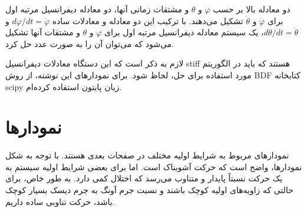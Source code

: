 \documentclass[12pt,a4paper]{article}
\begin{document}
	دو معادله بالا بر حسب $\varphi$ و $\theta$ و مشتقات زمانی آنها، دو معادله دیفرانسیل مرتبه اول برای $\dot{\varphi}$ و $\dot{\theta}$ تشکیل می‌دهند.
	با ترکیب این دو معادله و معادلات ساده $d\varphi/dt = \dot{\varphi}$ و $d\theta/dt = \dot{\theta}$،
	یک سیستم معادله دیفرانسیل مرتبه اول برای $\varphi$ و $\theta$ و مشتقات آنها تشکیل می‌شود که می‌توان آن را به صورت عدد حل کرد.
	
	لازم به ذکر است که این دستگاه معادلات دیفرانسیل stiff هستند که باید در الگوریتم مورد استفاده برای حل، لحاظ شود.
	برای نمودارهای این نوشته، از روش BDF کتابخانه scipy زبان پایتون استفاده کرده‌ام.
	\section{نمودارها}
	نمودارهای مربوط به شرایط اولیه مختلف در صفحات بعدی هستند. با توجه به شکل نمودارها، واضح است که حرکت آشوبناک است.
	اما برای بعضی شرایط اولیه سیستم به یک حرکت نسبتاً پایدار و متناوب می‌رسد که اختلال کمی دارد.
	به طور خاص، برای حالتی که زاویه‌های اولیه کوچک باشند و نسبت جرم آونگ به جرم دیسک بسیار کوچک باشد، حرکت تناوبی ساده داریم.
	
\end{document}
